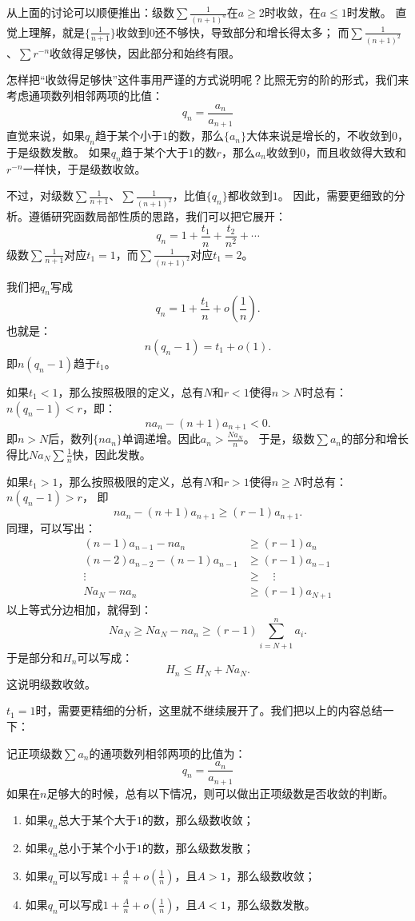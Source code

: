\documentclass[12pt,UTF8]{ctexbook}
\newcommand{\olim}[1]{\mathit{o}\left(#1\right)}  %
\begin{document}
从上面的讨论可以顺便推出：级数$\sum \frac{1}{(n+1)^a}$在$a\geqslant 2$时收敛，在$a\leqslant 1$时发散。
直觉上理解，就是$\{\frac{1}{n+1}\}$收敛到$0$还不够快，导致部分和增长得太多；
而$\sum \frac{1}{(n+1)^2}$、$\sum r^{-n}$收敛得足够快，因此部分和始终有限。

怎样把“收敛得足够快”这件事用严谨的方式说明呢？比照无穷的阶的形式，我们来考虑通项数列相邻两项的比值：
$$ q_n = \frac{a_n}{a_{n+1}} $$
直觉来说，如果$q_n$趋于某个小于$1$的数，那么$\{a_n\}$大体来说是增长的，不收敛到$0$，于是级数发散。
如果$q_n$趋于某个大于$1$的数$r$，那么$a_n$收敛到$0$，而且收敛得大致和$r^{-n}$一样快，于是级数收敛。

不过，对级数$\sum \frac{1}{n+1}$、$\sum \frac{1}{(n+1)^2}$，比值$\{q_n\}$都收敛到$1$。
因此，需要更细致的分析。遵循研究函数局部性质的思路，我们可以把它展开：
$$ q_n = 1 + \frac{t_1}{n} + \frac{t_2}{n^2} + \cdots $$
级数$\sum \frac{1}{n+1}$对应$t_1 = 1$，而$\sum \frac{1}{(n+1)^2}$对应$t_1 = 2$。

我们把$q_n$写成
$$ q_n = 1 + \frac{t_1}{n} + \olim{\frac{1}{n}}. $$
也就是：
$$ n(q_n - 1) = t_1 + \olim{1}.$$
即$n(q_n - 1)$趋于$t_1$。

如果$t_1 < 1$，那么按照极限的定义，总有$N$和$r<1$使得$n>N$时总有：$n(q_n - 1) < r$，即：
$$ na_n - (n+1)a_{n+1} < 0. $$
即$n>N$后，数列$\{na_n\}$单调递增。因此$a_n > \frac{Na_N}{n}$。
于是，级数$\sum a_n$的部分和增长得比$Na_N\sum \frac{1}{n}$快，因此发散。

如果$t_1 > 1$，那么按照极限的定义，总有$N$和$r>1$使得$n\geqslant N$时总有：$n(q_n - 1) > r$，
即
$$ na_n - (n+1)a_{n+1} \geqslant (r - 1)a_{n+1}.  $$
同理，可以写出：
\begin{align*}
    (n-1)a_{n-1} - na_n &\geqslant (r - 1)a_{n}  \\
    (n-2)a_{n-2} - (n-1)a_{n-1} &\geqslant (r - 1)a_{n-1}  \\
    \vdots \quad &\geqslant \quad \vdots  \\
    Na_{N} - na_n &\geqslant (r - 1)a_{N+1} 
\end{align*}
以上等式分边相加，就得到：
$$ Na_{N} \geqslant Na_{N} - na_n \geqslant (r - 1)\sum_{i=N+1}^n a_i. $$
于是部分和$H_n$可以写成：
$$ H_n \leqslant H_N + Na_{N}.$$
这说明级数收敛。

$t_1 = 1$时，需要更精细的分析，这里就不继续展开了。我们把以上的内容总结一下：

记正项级数$\sum a_n$的通项数列相邻两项的比值为：
$$ q_n = \frac{a_n}{a_{n+1}} $$
如果在$n$足够大的时候，总有以下情况，则可以做出正项级数是否收敛的判断。
\begin{enumerate}
    \item 如果$q_n$总大于某个大于$1$的数，那么级数收敛；
    \item 如果$q_n$总小于某个小于$1$的数，那么级数发散；
    \item 如果$q_n$可以写成$1 + \frac{A}{n} + \olim{\frac{1}{n}}$，且$A > 1$，那么级数收敛；
    \item 如果$q_n$可以写成$1 + \frac{A}{n} + \olim{\frac{1}{n}}$，且$A < 1$，那么级数发散。
\end{enumerate}
\end{document}

